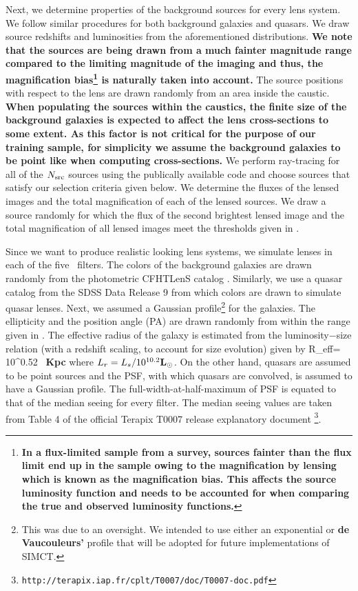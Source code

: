 \documentclass[useAMS,usenatbib,a4paper]{mn2e}
\begin{document}
Next, we determine properties of the background sources for every lens system.
We follow similar procedures for both background galaxies and quasars.
We draw source redshifts and luminosities from the aforementioned
distributions. {\bf We note that the sources are being drawn from a much
fainter magnitude range compared to the limiting magnitude of the
\cfhtls imaging and thus, the magnification bias\footnote{ {\bf In a
flux-limited sample from a survey, sources fainter than the flux limit
end up in the sample owing to the magnification by lensing which is
known as the magnification bias. This affects the source luminosity
function and needs to be accounted for when comparing the true and
observed luminosity functions.}} is naturally taken into account.} The
source positions with respect to the lens are drawn randomly from an
area inside the caustic.  {\bf When populating the sources within the
caustics, the finite size of the background galaxies is expected to
affect the lens cross-sections to some extent. As this factor is not
critical for the purpose of our training sample, for simplicity we assume the
background galaxies to be point like when computing cross-sections.} We perform
ray-tracing for all of the $N_{\rm src}$ sources using the publically
available code \gravlens \citep{Keeton2000} and choose sources that
satisfy our selection criteria given below. We determine the fluxes of the
lensed images and the total magnification of each of the lensed sources.
We draw a source randomly for which the flux of the second brightest
lensed image and the total magnification of all lensed images meet the
thresholds given in .

Since we want to produce realistic looking lens systems, we simulate
lenses in each of the five \cfhtls~filters. The colors of the background
galaxies are drawn randomly from the photometric CFHTLenS catalog
\citep{Hildebrandt2012,Erben2013}.  Similarly, we use a quasar catalog
from the SDSS Data Release 9 \citep{Paris2012} from which colors are
drawn to simulate quasar lenses. Next, we assumed a Gaussian
profile\footnote{This was due to an oversight. We intended to use either
an exponential or {\bf de Vaucouleurs'} profile that will be adopted for
future implementations of SIMCT.} for the galaxies. The ellipticity and
the position angle (PA) are drawn
randomly from within the range given in . The
effective radius of the galaxy is estimated from the luminosity$-$size
relation \citep{Bernardi2003} (with a redshift scaling, to account for
size evolution) given by
\be
R_{\rm eff}= 10^{0.52}  \, {\bf Kpc}
\ee
where $L_r=L_s/10^{10.2} {\bf L_\odot}$. On the other hand, quasars are assumed to be
point sources and the PSF, with which quasars are convolved, is assumed
to have a Gaussian profile. The full-width-at-half-maximum of PSF is
equated to that of the median seeing for every filter. The median seeing
values are taken from Table 4 of the official Terapix T0007 release
explanatory document \footnote{
\texttt{http://terapix.iap.fr/cplt/T0007/doc/T0007-doc.pdf}}.
\end{document}
